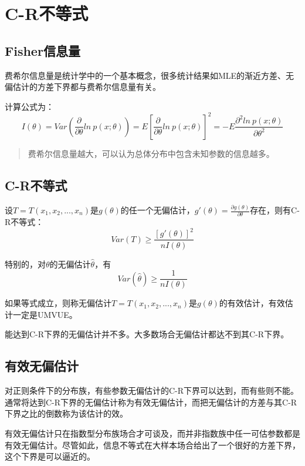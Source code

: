 \documentclass[
]{book}
\begin{document}
\section{C-R不等式}\label{c-rux4e0dux7b49ux5f0f}

\subsection{Fisher信息量}\label{fisherux4fe1ux606fux91cf}

费希尔信息量是统计学中的一个基本概念，很多统计结果如MLE的渐近方差、无偏估计的方差下界都与费希尔信息量有关。

计算公式为：
\[
I(\theta)=Var(\frac{\partial}{\partial\theta}ln\ p(x;\theta)) = E[\frac{\partial}{\partial\theta}ln\ p(x;\theta)]^2 = -E\frac{\partial^2ln\ p(x;\theta)}{\partial\theta^2}
\]

\begin{quote}
费希尔信息量越大，可以认为总体分布中包含未知参数的信息越多。
\end{quote}

\subsection{C-R不等式}\label{c-rux4e0dux7b49ux5f0f-1}

设\(T=T(x_1,x_2,...,x_n)\)是\(g(\theta)\)的任一个无偏估计，\(g'(\theta)=\frac{\partial g(\theta)}{\partial\theta}\)存在，则有C-R不等式：
\[
Var(T)\geq \frac{[g'(\theta)]^2}{nI(\theta)}
\]

特别的，对\(\theta\)的无偏估计\(\hat{\theta}\)，有
\[
Var(\hat{\theta})\geq \frac{1}{nI(\theta)}
\]

如果等式成立，则称无偏估计\(T=T(x_1,x_2,...,x_n)\)是\(g(\theta)\)的有效估计，有效估计一定是UMVUE。

能达到C-R下界的无偏估计并不多。大多数场合无偏估计都达不到其C-R下界。

\subsection{有效无偏估计}\label{ux6709ux6548ux65e0ux504fux4f30ux8ba1}

对正则条件下的分布族，有些参数无偏估计的C-R下界可以达到，而有些则不能。通常将达到C-R下界的无偏估计称为有效无偏估计，而把无偏估计的方差与其C-R下界之比的倒数称为该估计的效。

有效无偏估计只在指数型分布族场合才可谈及，而并非指数族中任一可估参数都是有效无偏估计。尽管如此，信息不等式在大样本场合给出了一个很好的方差下界，这个下界是可以逼近的。
\end{document}
